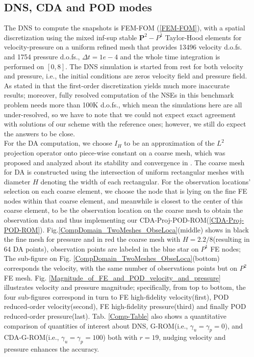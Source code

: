 \documentclass[10pt,twoside,openany,UTF8,CJK]{article}
\begin{document}
	\subsection{DNS, CDA and POD modes}
	\indent The DNS to compute the snapshots is FEM-FOM (\ref{FEM-FOM}), with a spatial discretization using the mixed inf-sup stable $\boldsymbol{P}^2-P^1$ Taylor-Hood elements for velocity-pressure on a uniform refined mesh that provides 13496 velocity d.o.fs. and 1754 pressure d.o.fs., $\Delta t=1e-4$ and the whole time integration is performed on $[0,8]$. The DNS simulation is started from rest for both velocity and pressure, i.e., the initial conditions are zeros velocity field and pressure field. As stated in \cite{RefValue-John-2004-IJNMF} that the first-order discretization yields much more inaccurate results; moreover, fully resolved computation of the NSEs in this benchmark problem needs more than  100K d.o.fs., which mean the simulations here are all under-resolved, so we have to note that we could not expect exact agreement with solutions of our scheme with the reference ones; however, we still do expect the answers to be close.  \\
	\indent For the DA computation, we choose $I_H$ to be an approximation of the $L^2$ projection operator onto piece-wise constant on a coarse mesh, which was proposed and analyzed about its stability and convergence in \cite{CDA-2021-NMPDE}. The coarse mesh for DA is constructed using the intersection of uniform rectangular meshes with diameter $H$ denoting the width of each rectangular. For the observation locations' selection on each coarse element, we choose the node that is lying on the fine FE nodes within that coarse element, and meanwhile is closest to the center of this coarse element, to be the observation location on the coarse mesh to obtain the observation data and thus implementing our CDA-Proj-POD-ROM(\ref{CDA-Proj-POD-ROM}).	Fig.\ref{CompDomain_TwoMeshes_ObseLoca}(middle) shows in black the fine mesh for pressure and in red the coarse mesh with $H=2.2/8$(resulting in 64 DA points), observation points are labeled in the blue star on $P^1$ FE nodes; The sub-figure on Fig. \ref{CompDomain_TwoMeshes_ObseLoca}(bottom) corresponds the velocity, with the same number of observations points but on $P^2$ FE mesh. Fig. \ref{Magnitude_of_FE_and_POD_velocity_and_pressure} illustrates velocity and pressure magnitude; specifically, from top to bottom, the four sub-figures correspond in turn to FE high-fidelity velocity(first), POD reduced-order velocity(second), FE high-fidelity pressure(third) and finally POD reduced-order pressure(last). Tab. \ref{Comp-Table} also shows a quantitative comparison of quantities of interest about DNS, G-ROM(i.e., $\gamma_u = \gamma_p = 0$), and CDA-G-ROM(i.e., $\gamma_u=\gamma_p=100$) both with $r=19$, nudging velocity and pressure enhances the accuracy. \\
\end{document}
